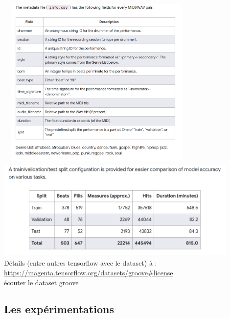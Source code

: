 \includegraphics[height=85mm, 
width=100mm]{z_images/3_groove/csv_metadata_struct.png}\\
\includegraphics[height=50mm, width=120mm]{z_images/3_groove/train_validation_test.png}\\
Détails (entre autres tensorflow avec le dataset) à :
\url{https://magenta.tensorflow.org/datasets/groove#license}\\
écouter le dataset groove
\newpage
\subsection*{Les expérimentations}
